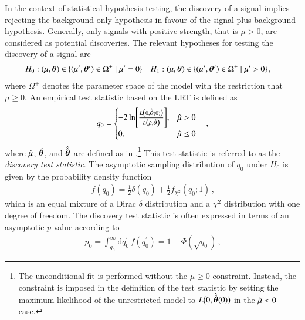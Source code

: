In the context of statistical hypothesis testing, the discovery of a signal
implies rejecting the background-only hypothesis in favour of the
signal-plus-background hypothesis. Generally, only signals with positive
strength, that is $\mu > 0$, are considered as potential discoveries. The
relevant hypotheses for testing the discovery of a signal are
\begin{align*}
  &H_0: (\mu, \bm{\theta}) \in \{ (\mu^\prime, \bm{\theta}^\prime) \in \Omega^+ \mid \mu^\prime = 0 \}
  &&H_1: (\mu, \bm{\theta}) \in \{ (\mu^\prime, \bm{\theta}^\prime) \in \Omega^+ \mid \mu^\prime > 0 \} \,\text{,}
\end{align*}
where $\Omega^+$ denotes the parameter space of the model with the restriction
that $\mu \geq 0$. An empirical test statistic based on the LRT is defined
as~\cite{Cowan:2010js}
\begin{align}
  q_0 = \begin{cases}
          -2 \ln\mathopen{}\left[ \frac{ L\bigl(0, \hat{\hat{\bm{\theta}}}(0) \bigr)}{L\bigl( \hat{\mu}, \hat{\bm{\theta}} \bigr)} \right]\mathclose{}, & \hat{\mu} > 0 \\
          0,          & \hat{\mu} \leq 0
        \end{cases} \quad\text{,}
  \label{eq:discovery_teststat}
\end{align}
where $\hat{\mu}$, $\hat{\bm{\theta}}$, and $\hat{\hat{\bm{\theta}}}$ are
defined as in .\footnote{The
  unconditional fit is performed without the $\mu \geq 0$ constraint. Instead,
  the constraint is imposed in the definition of the test statistic by setting
  the maximum likelihood of the unrestricted model to
  $L\bigl( 0, \hat{\hat{\bm{\theta}}}(0) \bigr)$ in the $\hat{\mu} < 0$ case.}
This test statistic is referred to as the \emph{discovery test statistic}. The
asymptotic sampling distribution of $q_0$ under $H_0$ is given by the
probability density function~\cite{Cowan:2010js}
\begin{align*}
  f(q_0) = \frac{1}{2} \delta(q_0) + \frac{1}{2} f_{\chi^2}(q_0; 1) \,\text{,}
\end{align*}
which is an equal mixture of a Dirac $\delta$ distribution and a $\chi^2$
distribution with one degree of freedom. The discovery test statistic is often
expressed in terms of an asymptotic $p$-value according to~\cite{Cowan:2010js}
\begin{align*}
  p_0 = \int_{q_{0}}^\infty \mathrm{d}q_0^\prime \, f(q_0^\prime) =
  1 - \Phi\left(\sqrt{q_{0}}\right) \,\text{,}
\end{align*}
